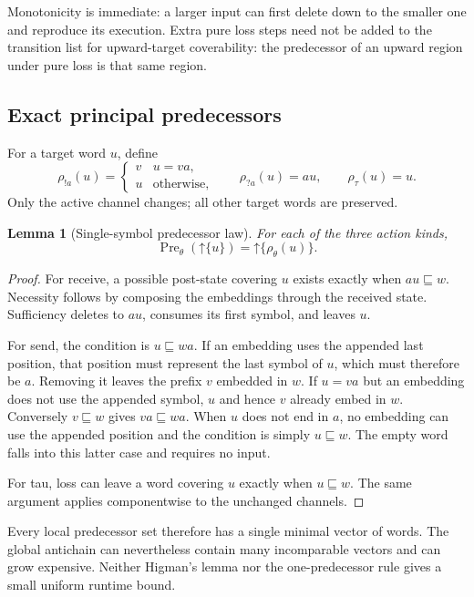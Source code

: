 \documentclass[11pt,a4paper]{article}
\newtheorem{lemma}[theorem]{Lemma}
\theoremstyle{definition}
\newcommand{\Up}[1]{\mathord{\uparrow}#1}
\newcommand{\Pre}{\operatorname{Pre}}
\begin{document}
Monotonicity is immediate: a larger input can first delete down to the
smaller one and reproduce its execution. Extra pure loss steps need not be
added to the transition list for upward-target coverability: the predecessor
of an upward region under pure loss is that same region.

\subsection{Exact principal predecessors}
For a target word $u$, define
\begin{equation}
 \rho_{!a}(u)=
 \begin{cases}
 v&u=va,\\
 u&\text{otherwise},
 \end{cases}
 \qquad
 \rho_{?a}(u)=au,
 \qquad
 \rho_\tau(u)=u.
 \label{eq:wordpre}
\end{equation}
Only the active channel changes; all other target words are preserved.

\begin{lemma}[Single-symbol predecessor law]
\label{lem:wordpre}
For each of the three action kinds,
\[
 \Pre_\theta(\Up{\{u\}})=\Up{\{\rho_\theta(u)\}}.
\]
\end{lemma}
\begin{proof}
For receive, a possible post-state covering $u$ exists exactly when
$au\sqsubseteq w$. Necessity follows by composing the embeddings through
the received state. Sufficiency deletes to $au$, consumes its first symbol,
and leaves $u$.

For send, the condition is $u\sqsubseteq wa$. If an embedding uses the
appended last position, that position must represent the last symbol of $u$,
which must therefore be $a$. Removing it leaves the prefix $v$ embedded in
$w$. If $u=va$ but an embedding does not use the appended symbol, $u$ and
hence $v$ already embed in $w$. Conversely $v\sqsubseteq w$ gives
$va\sqsubseteq wa$. When $u$ does not end in $a$, no embedding can use the
appended position and the condition is simply $u\sqsubseteq w$. The empty
word falls into this latter case and requires no input.

For tau, loss can leave a word covering $u$ exactly when $u\sqsubseteq w$.
The same argument applies componentwise to the unchanged channels.
\end{proof}

Every local predecessor set therefore has a single minimal vector of words.
The global antichain can nevertheless contain many incomparable vectors and
can grow expensive. Neither Higman's lemma nor the one-predecessor rule gives
a small uniform runtime bound.
\end{document}

